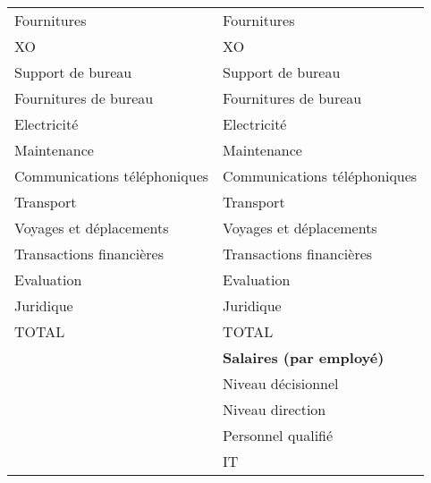 \documentclass[11pt]{article}
\begin{document}
\begin{longtable}{|l|l|}
 Fournitures                                       &  Fournitures                                        \\
 XO                                                &  XO                                                 \\
 Support de bureau                                 &  Support de bureau                                  \\
 Fournitures de bureau                             &  Fournitures de bureau                              \\
 Electricité                                       &  Electricité                                        \\
 Maintenance                                       &  Maintenance                                        \\
 Communications téléphoniques                      &  Communications téléphoniques                       \\
 Transport                                         &  Transport                                          \\
 Voyages et déplacements                           &  Voyages et déplacements                            \\
 Transactions financières                          &  Transactions financières                           \\
 Evaluation                                        &  Evaluation                                         \\
 Juridique                                         &  Juridique                                          \\
 TOTAL                                             &  TOTAL                                              \\
\hline
                                                   &  \textbf{Salaires (par employé)}                    \\
                                                   &  Niveau décisionnel                                 \\
                                                   &  Niveau direction                                   \\
                                                   &  Personnel qualifié                                 \\
                                                   &  IT                                                 \\

\end{longtable}
\end{document}
